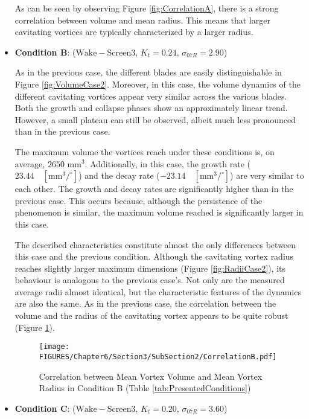 \begin{itemize}
    As can be seen by observing Figure \ref{fig:CorrelationA}, there is a strong correlation between volume and mean radius. This means that larger cavitating vortices are typically characterized by a larger radius.
 
    \item  \textbf{Condition B}: ($\mathrm{Wake-Screen3}$, $K_t = 0.24$, $\sigma_{07R} = 2.90$)
    
    As in the previous case, the different blades are easily distinguishable in Figure \ref{fig:VolumeCase2}. Moreover, in this case, the volume dynamics of the different cavitating vortices appear very similar across the various blades.  
    Both the growth and collapse phases show an approximately linear trend. However, a small plateau can still be observed, albeit much less pronounced than in the previous case.  
    
    The maximum volume the vortices reach under these conditions is, on average, $2650 \text{ mm}^3$. Additionally, in this case, the growth rate ($23.44 \quad [\text{mm}^3/^{\circ}]$) and the decay rate ($-23.14 \quad [\text{mm}^3/^{\circ}]$) are very similar to each other. The growth and decay rates are significantly higher than in the previous case. This occurs because, although the persistence of the phenomenon is similar, the maximum volume reached is significantly larger in this case.
    
    The described characteristics constitute almost the only differences between this case and the previous condition.  
    Although the cavitating vortex radius reaches slightly larger maximum dimensions (Figure \ref{fig:RadiiCase2}), its behaviour is analogous to the previous case's. Not only are the measured average radii almost identical, but the characteristic features of the dynamics are also the same.
    As in the previous case, the correlation between the volume and the radius of the cavitating vortex appears to be quite robust (Figure \ref{fig:CorrelationB}).

    \begin{figure}[h] 
        \centering
        \texttt{[image: FIGURES/Chapter6/Section3/SubSection2/CorrelationB.pdf]}
        \caption{Correlation between Mean Vortex Volume and Mean Vortex Radius in Condition B (Table \ref{tab:PresentedConditions})}
        \label{fig:CorrelationB}
    \end{figure}

    \item \textbf{Condition C}: ($\mathrm{Wake-Screen3}$, $K_t = 0.20$, $\sigma_{07R} = 3.60$)
    

\end{itemize}
